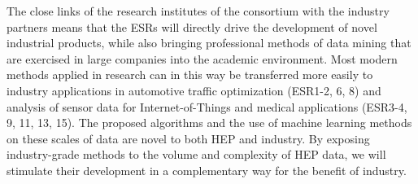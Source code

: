 The close links of the research institutes of the consortium with the industry partners means that the ESRs will directly drive the development of novel industrial products, while also bringing professional methods of data mining that are exercised in large companies into the academic environment. 
Most modern methods applied in research can in this way be transferred more easily to industry applications in automotive traffic optimization (ESR1-2, 6, 8) and analysis of sensor data for Internet-of-Things and medical applications (ESR3-4, 9, 11, 13, 15).
The proposed algorithms and the use of machine learning methods on these scales of data are novel to both HEP and industry. 
By exposing industry-grade methods to the volume and complexity of HEP data, we will stimulate their development in a complementary way for the benefit of industry.

